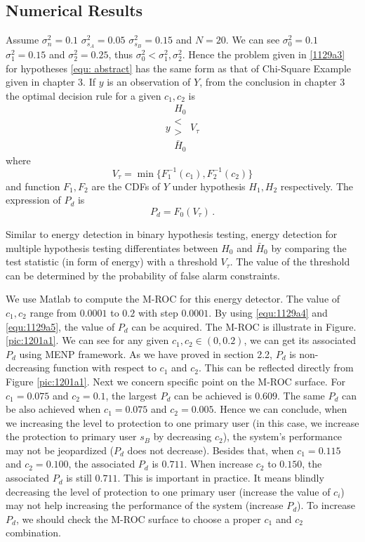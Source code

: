 \subsection{Numerical Results}
Assume $\sigma_n^2=0.1$ $\sigma_{s_A}^2=0.05$ $\sigma_{s_B}^2=0.15$ and $N=20$. We can see $\sigma_0^2=0.1$ $\sigma_1^2=0.15$ and $\sigma_2^2=0.25$, 
thus $\sigma_0^2 < \sigma_1^2, \sigma_2^2$. Hence the problem given in \eqref{1129a3} for hypotheses \eqref{equ: abstract} has the same form as that of Chi-Square Example given in chapter 3. 
If $y$ is an observation of $Y$, 
from the conclusion in chapter 3 the optimal  decision rule for a given $c_1, c_2$ is 
\begin{equation}
  y \substack{H_0 \\ < \\ > \\ \bar{H}_0} V_\tau
  \label{equ:1129a4}
\end{equation}
where 
\begin{equation}
  V_\tau = \min\{F_1^{-1}(c_1),  F_2^{-1}(c_2)\}
  \label{equ:2015may1a2}
\end{equation}
and function $F_1,  F_2$ are the CDFs of $Y$ under hypothesis $H_1, H_2$ respectively. The expression of $P_d$ is 
\begin{equation}
  P_d = F_0(V_\tau)\,.
  \label{equ:1129a5}
\end{equation}

Similar to energy detection in binary hypothesis testing, energy detection for multiple hypothesis testing differentiates between $H_0$ and $\bar{H}_0$ by comparing the test statistic (in form of energy) with a threshold $V_\tau$. The value of the threshold can be determined by the probability of false alarm constraints.   

We use Matlab to compute the M-ROC for this energy detector. The value of $c_1, c_2$ range from $0.0001$ to $0.2$ with step $0.0001$. By using \eqref{equ:1129a4} and \eqref{equ:1129a5}, the value of $P_d$ can be acquired. The M-ROC is illustrate in Figure. \ref{pic:1201a1}. We can see for any given $c_1, c_2 \in (0, 0.2)$, we can get its associated $P_d$ using MENP framework. As we have proved in section 2.2, $P_d$ is non-decreasing function with respect to $c_1$ and $c_2$. This can be reflected directly from Figure \ref{pic:1201a1}.   
Next we concern specific point on the M-ROC surface. For $c_1 = 0.075$ and $c_2  = 0.1$, the largest $P_d$ can be achieved is $0.609$. The same $P_d$ can be also achieved when $c_1 = 0.075$ and $c_2 = 0.005$.  
Hence we can conclude, when  we increasing the level to protection to one primary user (in this case, we increase the protection to primary user $s_B$ by decreasing $c_2$), the system's performance may not be jeopardized ($P_d$ does not decrease).   
Besides that, when $c_1 = 0.115$ and $c_2 = 0.100$, the associated $P_d$ is $0.711$. When increase $c_2$ to $0.150$, the associated $P_d     $ is still $0.711$. This is important in practice. It means blindly decreasing the level of protection to one primary user (increase the value of $c_i$) may not help increasing the performance of the system (increase $P_d$). To increase $P_d$, we should check the M-ROC surface to choose a proper $c_1$ and $c_2$ combination.

